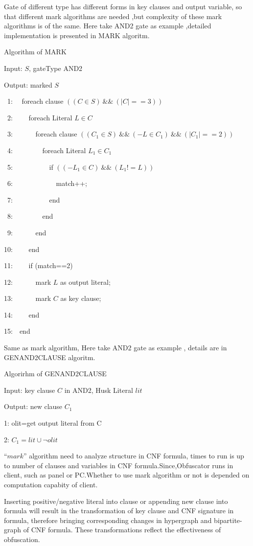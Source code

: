 \documentclass[runningheads,a4paper]{llncs}
\begin{document}
Gate of different type has different forms in key clauses and output variable, so that different mark algorithms are needed ,but complexity of these mark algorithms is of the same. 
Here take AND2 gate as example ,detailed implementation is presented in MARK algoritm.  

\noindent Algorithm of MARK

Input: $S$, gateType AND2

Output: marked $S$ 

~1:~~  foreach clause $((C \in S) ~\&\&~ (|C|==3))$

~2:~~~~    foreach Literal $L \in C$ 

~3:~~~~~~	   foreach clause $((C_1 \in S) ~\&\&~ (-L\in C_1)~ \&\&~ (|C_1|==2)) $

~4:~~~~~~~~		foreach Literal $ L_1 \in C_1$ 

~5:~~~~~~~~~~		  if $((-L_1 \in C)~\&\&~(L_1!=L))$

~6:~~~~~~~~~~~~				match++;

~7:~~~~~~~~~~		  end

~8:~~~~~~~~		end

~9:~~~~~~          end 

10:~~~~	    end

11:~~~~     if (match==2)

12:~~~~~~	  mark $L$ as output literal;

13:~~~~~~	  mark $C$ as key clause;

14:~~~~     end

15:~~end

Same as mark algorithm, Here take AND2 gate as example , details are in GENAND2CLAUSE algoritm.

\noindent Algorirhm of GENAND2CLAUSE

Input: key clause $C$ in AND2, Husk Literal $lit$

Output: new clause $C_1$

1: olit=get output literal from C

2: $C_1= lit \cup \neg olit$

$“mark”$ algorithm need to analyze structure in CNF formula, times to run is up to number of clauses and variables in CNF formula.Since,Obfuscator runs in client, such as panel or PC.Whether to use mark algorithm or not is depended on computation capabity of client.

Inserting positive/negative literal into clause or appending new clause into formula will result in the transformation of key clause and CNF signature in formula, 
therefore bringing corresponding changes in hypergraph and bipartite-graph of CNF formula.
These transformations reflect the effectiveness of obfuscation.
\end{document}
